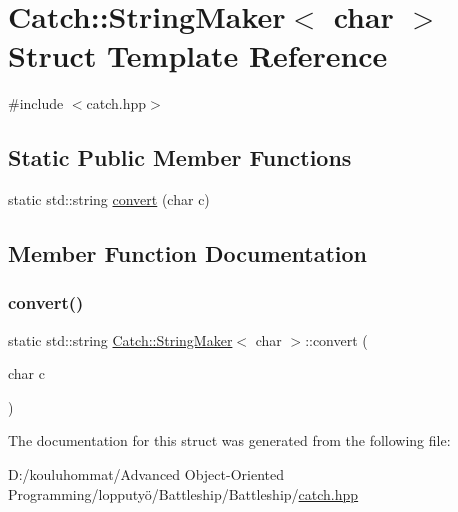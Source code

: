 \hypertarget{struct_catch_1_1_string_maker_3_01char_01_4}{}\section{Catch\+:\+:String\+Maker$<$ char $>$ Struct Template Reference}
\label{struct_catch_1_1_string_maker_3_01char_01_4}


{\ttfamily \#include $<$catch.\+hpp$>$}

\subsection*{Static Public Member Functions}
\begin{DoxyCompactItemize}
\item 
static std\+::string \mbox{\hyperlink{struct_catch_1_1_string_maker_3_01char_01_4_a4e3db69a12bb83f3ef89251893e65da5}{convert}} (char c)
\end{DoxyCompactItemize}


\subsection{Member Function Documentation}
\mbox{\label{struct_catch_1_1_string_maker_3_01char_01_4_a4e3db69a12bb83f3ef89251893e65da5}} 
\subsubsection{\texorpdfstring{convert()}{convert()}}
{\footnotesize\ttfamily static std\+::string \mbox{\hyperlink{struct_catch_1_1_string_maker}{Catch\+::\+String\+Maker}}$<$ char $>$\+::convert (\begin{DoxyParamCaption}\item[{char}]{c }\end{DoxyParamCaption})\hspace{0.3cm}{\ttfamily [static]}}



The documentation for this struct was generated from the following file\+:\begin{DoxyCompactItemize}
\item 
D\+:/kouluhommat/\+Advanced Object-\/\+Oriented Programming/lopputyö/\+Battleship/\+Battleship/\mbox{\hyperlink{catch_8hpp}{catch.\+hpp}}\end{DoxyCompactItemize}
